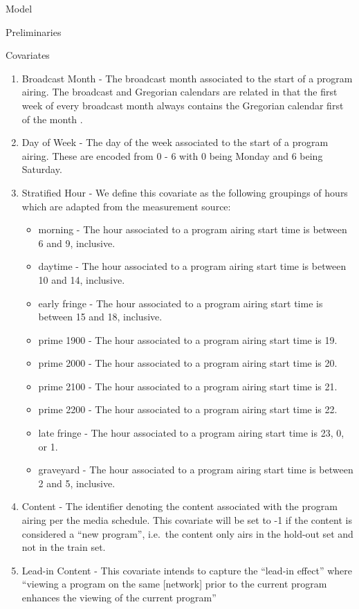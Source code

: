 \begin{chapter}{Model}
\begin{section}{Preliminaries}
\begin{subsection}{Covariates}
    \begin{enumerate}
    \item Broadcast Month - The broadcast month associated to the start of a program airing.
      The broadcast and Gregorian calendars are related in that the first week of every broadcast month always contains the Gregorian calendar first of the month \cite{calendar}.
    \item Day of Week - The day of the week associated to the start of a program airing.
      These are encoded from 0 - 6 with 0 being Monday and 6 being Saturday.
    \item Stratified Hour - We define this covariate as the following groupings of hours which are adapted from the measurement source:
      \begin{itemize}
        \item morning - The hour associated to a program airing start time is between 6 and 9, inclusive.
        \item daytime - The hour associated to a program airing start time is between 10 and 14, inclusive.
        \item early fringe - The hour associated to a program airing start time is between 15 and 18, inclusive.
        \item prime 1900 - The hour associated to a program airing start time is 19.
        \item prime 2000 - The hour associated to a program airing start time is 20.
        \item prime 2100 - The hour associated to a program airing start time is 21.
        \item prime 2200 - The hour associated to a program airing start time is 22.
        \item late fringe - The hour associated to a program airing start time is 23, 0, or 1.
        \item graveyard - The hour associated to a program airing start time is between 2 and 5, inclusive.
      \end{itemize}
    \item Content - The identifier denoting the content associated with the program airing per the media schedule.
      This covariate will be set to -1 if the content is considered a ``new program'', i.e.\ the content only airs in
      the hold-out set and not in the train set.
    \item Lead-in Content -
      This covariate intends to capture the ``lead-in effect'' where
      ``viewing a program on the same [network] prior to the current program enhances the viewing of the current program''

\end{enumerate}
\end{subsection}
\end{section}
\end{chapter}
